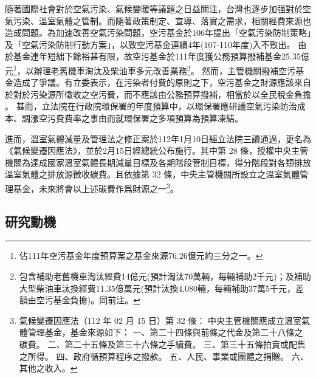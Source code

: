 \documentclass[12pt,a4paper]{article}
\begin{document}
隨著國際社會對於空氣污染、氣候變暖等議題之日益關注，台灣也逐步加强對於空氣污染、溫室氣體之管制。而隨著政策制定、宣導、落實之需求，相關經費來源也造成問題。為加速改善空氣污染問題，空污基金於106年提出「空氣污染防制策略」及「空氣污染防制行動方案」，以致空污基金連續4年(107-110年度)入不敷出。
由於基金連年短絀下餘裕甚有限，故空污基金於111年度獲公務預算撥補基金25.35億元\footnote{佔111年空污基金年度預算案之基金來源76.26億元約三分之一。}，以辦理老舊機車淘汰及柴油車多元改善業務\footnote{包含補助老舊機車淘汰經費14億元(預計淘汰70萬輛，每輛補助2千元)；及補助大型柴油車汰換經費11.35億萬元(預計汰換4,080輛，每輛補助37萬5千元，差額由空污基金負擔)。同前注。}。
然而，主管機關撥補空污基金造成了爭議。有立委表示，在污染者付費的原則之下，空污基金之財源應該來自於對於污染源所徵收之空污費，而不應該由公務預算撥補，相當於以全民稅金負擔
。
甚而，立法院在行政院環保署的年度預算中，以環保署應研議空氣污染防治成本、調漲空污費費率之事由而就環保署之多項預算為預算凍結。

進而，溫室氣體減量及管理法之修正案於112年1月10日經立法院三讀通過，更名為《氣候變遷因應法》，並於2月15日經總統公布施行。其中第 28 條，授權中央主管機關為達成國家溫室氣體長期減量目標及各期階段管制目標，得分階段對各類排放溫室氣體之排放源徵收碳費。且依據第 32 條，中央主管機關所設立之溫室氣體管理基金，未來將會以上述碳費作爲財源之一\footnote{氣候變遷因應法（112 年 02 月 15 日）第 32 條：
中央主管機關應成立溫室氣體管理基金，基金來源如下：
一、第二十四條與前條之代金及第二十八條之碳費。
二、第二十五條及第三十六條之手續費。
三、第三十五條拍賣或配售之所得。
四、政府循預算程序之撥款。
五、人民、事業或團體之捐贈。
六、其他之收入。}。



\subsection{研究動機}
\end{document}
